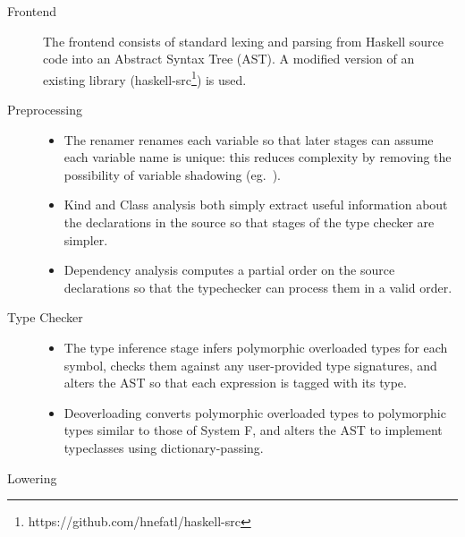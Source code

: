 \documentclass[dissertation.tex]{subfiles}
\begin{document}
\begin{description}
\item[Frontend]
{
    \hfill

    The frontend consists of standard lexing and parsing from Haskell source code into an Abstract Syntax Tree
    (AST). A modified version of an existing library (haskell-src\footnote{https://github.com/hnefatl/haskell-src})
    is used.

}
\item[Preprocessing]
{
    \hfill
    \begin{itemize}
    \item
    {

        The renamer renames each variable so that later stages can assume each variable name is unique:
        this reduces complexity by removing the possibility of variable shadowing (eg.\ ).

    }
    \item
    {

        Kind and Class analysis both simply extract useful information about the declarations in the source so that
        stages of the type checker are simpler.

    }
    \item
    {

        Dependency analysis computes a partial order on the source declarations so that the typechecker can process
        them in a valid order.

    }
    \end{itemize}
}
\item[Type Checker]
{
    \hfill
    \begin{itemize}
    \item
    {

        The type inference stage infers polymorphic overloaded types for each symbol, checks them against any
        user-provided type signatures, and alters the AST so that each expression is tagged with its type.

    }
    \item
    {

        Deoverloading converts polymorphic overloaded types to polymorphic types similar to those of System F, and
        alters the AST to implement typeclasses using dictionary-passing.

    }
    \end{itemize}
}
\item[Lowering]
{
    \hfill

}
\end{description}
\end{document}
